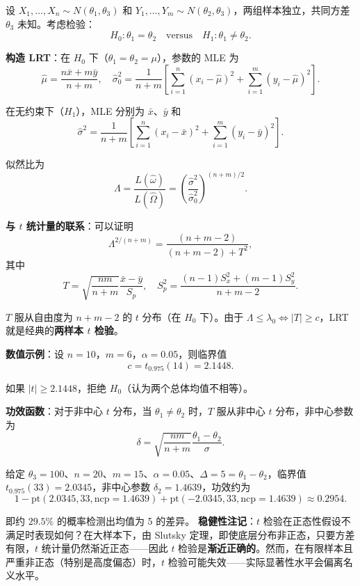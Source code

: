 \begin{example}[两样本 $t$ 检验]\label{ex:two-sample-t-test}
设 $X_1, \ldots, X_n \sim N(\theta_1, \theta_3)$ 和 $Y_1, \ldots, Y_m \sim N(\theta_2, \theta_3)$，两组样本独立，共同方差 $\theta_3$ 未知。考虑检验：
\[
H_0: \theta_1 = \theta_2 \quad \text{versus} \quad H_1: \theta_1 \neq \theta_2.
\]

\textbf{构造 LRT}：在 $H_0$ 下（$\theta_1 = \theta_2 = \mu$），参数的 MLE 为
\[
\hat{\mu} = \frac{n\bar{x} + m\bar{y}}{n+m}, \quad \hat{\sigma}_0^2 = \frac{1}{n+m}\left[\sum_{i=1}^n (x_i - \hat{\mu})^2 + \sum_{i=1}^m (y_i - \hat{\mu})^2\right].
\]

在无约束下（$H_1$），MLE 分别为 $\bar{x}$、$\bar{y}$ 和
\[
\hat{\sigma}^2 = \frac{1}{n+m}\left[\sum_{i=1}^n (x_i - \bar{x})^2 + \sum_{i=1}^m (y_i - \bar{y})^2\right].
\]

似然比为
\[
\Lambda = \frac{L(\hat{\omega})}{L(\hat{\Omega})} = \left(\frac{\hat{\sigma}^2}{\hat{\sigma}_0^2}\right)^{(n+m)/2}.
\]

\textbf{与 $t$ 统计量的联系}：可以证明
\[
\Lambda^{2/(n+m)} = \frac{(n+m-2)}{(n+m-2) + T^2},
\]
其中
\[
T = \sqrt{\frac{nm}{n+m}} \frac{\bar{x} - \bar{y}}{S_p}, \quad S_p^2 = \frac{(n-1)S_x^2 + (m-1)S_y^2}{n+m-2}.
\]

$T$ 服从自由度为 $n+m-2$ 的 $t$ 分布（在 $H_0$ 下）。由于 $\Lambda \leq \lambda_0 \Leftrightarrow |T| \geq c$，LRT 就是经典的\textbf{两样本 $t$ 检验}。

\textbf{数值示例}：设 $n = 10$，$m = 6$，$\alpha = 0.05$，则临界值
\[
c = t_{0.975}(14) = 2.1448.
\]

如果 $|t| \geq 2.1448$，拒绝 $H_0$（认为两个总体均值不相等）。\end{example}

\textbf{功效函数}：对于非中心 $t$ 分布，当 $\theta_1 \neq \theta_2$ 时，$T$ 服从非中心 $t$ 分布，非中心参数为
\[
\delta = \sqrt{\frac{nm}{n+m}} \frac{\theta_1 - \theta_2}{\sigma}.
\]

给定 $\theta_3 = 100$、$n = 20$、$m = 15$、$\alpha = 0.05$、$\Delta = 5 = \theta_1 - \theta_2$，临界值 $t_{0.975}(33) = 2.0345$，非中心参数 $\delta_2 = 1.4639$，功效约为
\[
1 - \text{pt}(2.0345, 33, \text{ncp}=1.4639) + \text{pt}(-2.0345, 33, \text{ncp}=1.4639) \approx 0.2954.
\]

即约 $29.5\%$ 的概率检测出均值为 5 的差异。
\textbf{稳健性注记}：$t$ 检验在正态性假设不满足时表现如何？在大样本下，由 Slutsky 定理，即使底层分布非正态，只要方差有限，$t$ 统计量仍然渐近正态——因此 $t$ 检验是\textbf{渐近正确的}。然而，在有限样本且严重非正态（特别是高度偏态）时，$t$ 检验可能失效——实际显著性水平会偏离名义水平。
